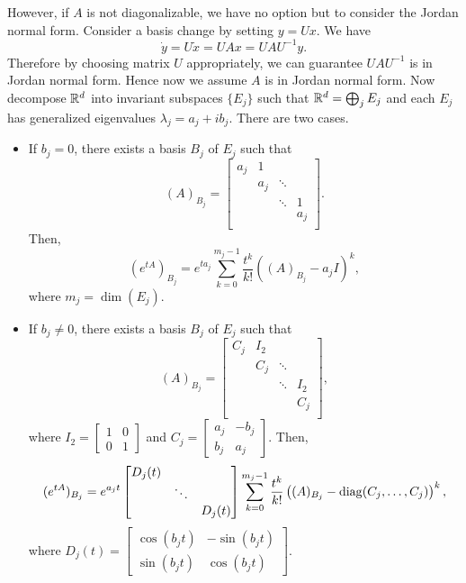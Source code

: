 \documentclass[a4paper]{article}
\begin{document}
However, if $A$ is not diagonalizable, we have no option but to consider
the Jordan normal form. Consider a basis change by setting $y = U x$. We
have
\[
  \dot{y} = U \dot{x} = U A x = U A U^{-1} y.
\]
Therefore by choosing matrix $U$ appropriately, we can guarantee
  $UAU^{-1}$ is in Jordan normal form. Hence now we assume $A$ is in
  Jordan normal form. Now decompose $\mathbb{R}^d$ into invariant subspaces
  $\{E_j\}$ such that $\mathbb{R}^d = \bigoplus_j E_j$ and each $E_j$ has
  generalized eigenvalues $\lambda_j = a_j + i b_j$. There are two cases.
\begin{itemize}
  \item If $b_j = 0$, there exists a basis $B_j$ of $E_j$ such that
        \[
          (A)_{B_j} = \begin{bmatrix}
            a_j & 1   &        &     \\
                & a_j & \ddots &     \\
                &     & \ddots & 1   \\
                &     &        & a_j \\
          \end{bmatrix}.
        \]
        Then,
        \[
          (e^{tA})_{B_j} = e^{t a_j} \sum_{k = 0}^{m_j - 1} \frac{t^k}{k!}
          \left( (A)_{B_j} - a_j I \right)^k,
        \]
        where $m_j = \dim(E_j)$.

  \item If $b_j \neq 0$, there exists a basis $B_j$ of $E_j$ such that
        \[
          (A)_{B_j} = \begin{bmatrix}
            C_j & I_2 &        &     \\
                & C_j & \ddots &     \\
                &     & \ddots & I_2 \\
                &     &        & C_j \\
          \end{bmatrix},
        \]
        where $I_2 = \begin{bmatrix}
            1 & 0 \\
            0 & 1
          \end{bmatrix}$
        and $C_j = \begin{bmatrix}
            a_j & -b_j \\
            b_j & a_j
          \end{bmatrix}$.
        Then,
        \[
          (e^{tA})_{B_j} = e^{a_j t} \begin{bmatrix}
            D_j (t) &        &         \\
                    & \ddots &         \\
                    &        & D_j (t)
          \end{bmatrix}  \sum_{k = 0}^{m_j - 1} \frac{t^k}{k!}
          \left( (A)_{B_j} - \operatorname{diag} (C_j, \dots, C_j) \right)^k,
        \]
        where $D_j (t) = \begin{bmatrix}
            \cos (b_j t) & - \sin(b_j t) \\
            \sin (b_j t) & \cos (b_j t)
          \end{bmatrix}$.

\end{itemize}
\end{document}
